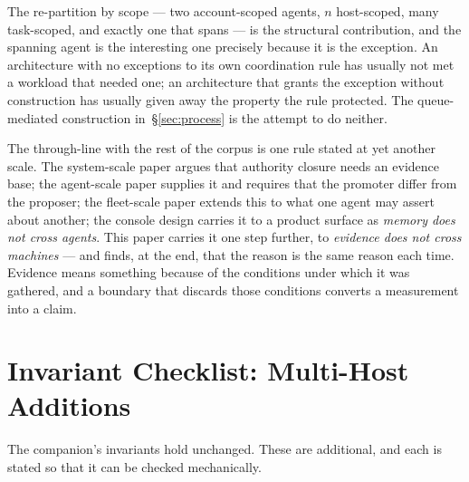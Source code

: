 \documentclass[11pt]{article}
\begin{document}
The re-partition by scope --- two account-scoped agents, $n$ host-scoped, many task-scoped, and exactly one that spans --- is the structural contribution, and the spanning agent is the interesting one precisely because it is the exception. An architecture with no exceptions to its own coordination rule has usually not met a workload that needed one; an architecture that grants the exception without construction has usually given away the property the rule protected. The queue-mediated construction in~\S\ref{sec:process} is the attempt to do neither.

The through-line with the rest of the corpus is one rule stated at yet another scale. The system-scale paper argues that authority closure needs an evidence base; the agent-scale paper supplies it and requires that the promoter differ from the proposer; the fleet-scale paper extends this to what one agent may assert about another; the console design carries it to a product surface as \emph{memory does not cross agents}. This paper carries it one step further, to \emph{evidence does not cross machines} --- and finds, at the end, that the reason is the same reason each time. Evidence means something because of the conditions under which it was gathered, and a boundary that discards those conditions converts a measurement into a claim.

\appendix

\section{Invariant Checklist: Multi-Host Additions}
\label{app:invariants}

The companion's invariants hold unchanged. These are additional, and each is stated so that it can be checked mechanically.
\end{document}
